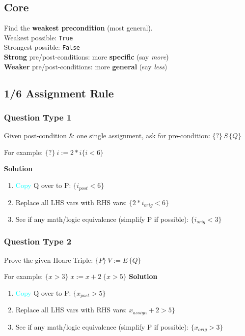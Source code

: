 \subsection*{Core}
Find the \textbf{weakest precondition} (most general).\\
\textcolor{bl}{Weakest} possible: \textcolor{gr}{\texttt{True}} \\
\textcolor{bl}{Strongest} possible: \textcolor{gr}{\texttt{False}} \\
\textbf{Strong} pre/post-conditions: more \textbf{specific} (say \emph{\textcolor{bl}{more}}) \\
\textbf{Weaker} pre/post-conditions: more \textbf{general} (say \emph{\textcolor{bl}{less}})

\subsection*{1/6 Assignment Rule}
\subsubsection*{Question Type 1}
Given post-condition \& one single assignment, ask for pre-condition:
\(\{?\}\,S\,\{Q\}\)

For example: \(\{?\}\ i := 2 * i \{i < 6\}\)

\textbf{Solution}
\begin{enumerate}
\item \textcolor{Cyan}{Copy} Q over to P: \(\{i_{post} < 6\}\)
\item Replace all LHS vars with RHS vars: \(\{2 * i_{orig} < 6\}\)
\item See if any math/logic equivalence (simplify P if possible): \(\{i_{orig} < 3\}\)
\end{enumerate}

\subsubsection*{Question Type 2}
Prove the given Hoare Triple: \(\{P\}\,V := E\,\{Q\}\)

For example: \(\{x > 3\}\;x:=x+2\;\{x>5\}\)
\textbf{Solution}
\begin{enumerate}
\item \textcolor{Cyan}{Copy} Q over to P: \(\{x_{post} > 5\}\)
\item Replace all LHS vars with RHS vars: \(x_{assign}+2 > 5\}\)
\item See if any math/logic equivalence (simplify P if possible): \(\{x_{orig} > 3\}\)
\end{enumerate}



